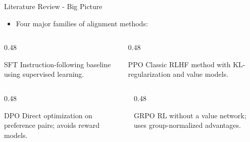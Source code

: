 \documentclass[10pt]{beamer}
\begin{document}
\begin{frame}{Literature Review - Big Picture}
    \large
    \begin{itemize}
        \item Four major families of alignment methods:
    \end{itemize}
    \vspace{0.4cm}

    \begin{columns}[t, onlytextwidth] 
        
        \begin{column}{0.48\linewidth}
            \begin{block}{SFT}
                Instruction-following baseline using supervised learning.
            \end{block}
        \end{column}

        \begin{column}{0.48\linewidth}
            \begin{block}{PPO}
                Classic RLHF method with KL-regularization and value models.
            \end{block}
        \end{column}
    \end{columns}

    \vspace{0.3cm} %

    \begin{columns}[t, onlytextwidth]
        \begin{column}{0.48\linewidth}
            \begin{block}{DPO}
                Direct optimization on preference pairs; avoids reward models.
            \end{block}
        \end{column}

        \begin{column}{0.48\linewidth}
            \begin{block}{GRPO}
                RL without a value network; uses group-normalized advantages.
            \end{block}
        \end{column}
    \end{columns}

    \vspace{0.4cm}
    \centering
\end{frame}
\end{document}
